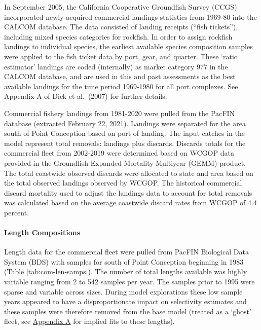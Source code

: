 \documentclass[11pt,
  english,
  a4paper,
]{article}
\begin{document}
In September 2005, the California Cooperative Groundfish Survey (CCGS) incorporated newly acquired commercial landings statistics from 1969-80 into the CALCOM database. The data consisted of landing receipts (``fish tickets''), including mixed species categories for rockfish. In order to assign rockfish landings to individual species, the earliest available species composition samples were applied to the fish ticket data by port, gear, and quarter. These `ratio estimator' landings are coded (internally) as market category 977 in the CALCOM database, and are used in this and past assessments as the best available landings for the time period 1969-1980 for all port complexes. See Appendix A of Dick et al.~{(2007)\leavevmode\tagmcend\tagstructend} for further details.

\leavevmode\tagmcend\tagstructend\par


Commercial fishery landings from 1981-2020 were pulled from the PacFIN database (extracted February 22, 2021). Landings were separated for the area south of Point Conception based on port of landing. The input catches in the model represent total removals: landings plus discards. Discards totals for the commercial fleet from 2002-2019 were determined based on WCGOP data provided in the Groundfish Expanded Mortality Multiyear (GEMM) product. The total coastwide observed discards were allocated to state and area based on the total observed landings observed by WCGOP. The historical commercial discard mortality used to adjust the landings data to account for total removals was calculated based on the average coastwide discard rates from WCGOP of 4.4 percent.

\leavevmode\tagmcend\tagstructend\par


\hypertarget{length-compositions}{%
\paragraph{Length Compositions}\label{length-compositions}}

\leavevmode\tagmcend\tagstructend


Length data for the commercial fleet were pulled from PacFIN Biological Data System (BDS) with samples for south of Point Conception beginning in 1983 (Table \ref{tab:com-len-samps}). The number of total lengths available was highly variable ranging from 2 to 542 samples per year. The samples prior to 1995 were sparse and variable across sizes. During model explorations these low sample years appeared to have a disproportionate impact on selectivity estimates and these samples were therefore removed from the base model (treated as a `ghost' fleet, see {\protect\hyperlink{append_a}{Appendix A}\leavevmode\tagmcend\tagstructend} for implied fits to these lengths).
\end{document}
